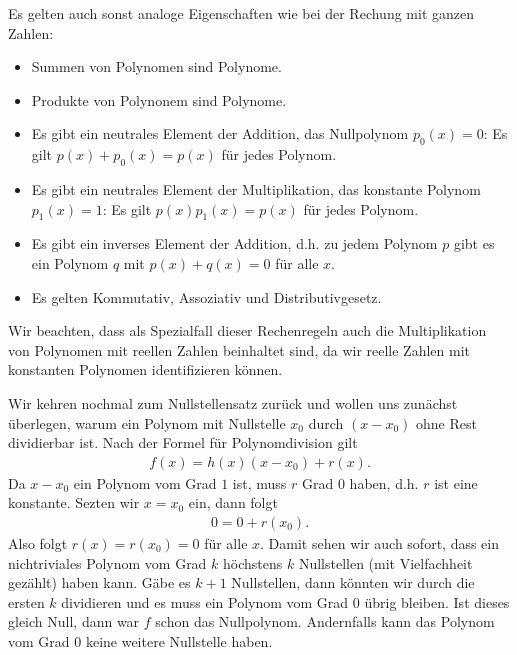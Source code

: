 \documentclass[letterpaper,10pt,english]{jupyterBook}
\begin{document}
Es gelten auch sonst analoge Eigenschaften wie bei der Rechung mit ganzen Zahlen:
\begin{itemize}
\item {} 
Summen von Polynomen sind Polynome.

\item {} 
Produkte von Polynonem sind Polynome.

\item {} 
Es gibt ein neutrales Element der Addition, das Nullpolynom \(p_0(x)=0\): Es gilt \(p(x) + p_0(x) = p(x)\) für jedes Polynom.

\item {} 
Es gibt ein neutrales Element der Multiplikation, das konstante Polynom \(p_1(x)=1\): Es gilt \(p(x) p_1(x) = p(x)\) für jedes Polynom.

\item {} 
Es gibt ein inverses Element der Addition, d.h. zu jedem Polynom \(p\) gibt es ein Polynom \(q\) mit \(p(x) + q(x) =0\) für alle \(x\).

\item {} 
Es gelten Kommutativ\sphinxhyphen{}, Assoziativ\sphinxhyphen{} und Distributivgesetz.

\end{itemize}

Wir beachten, dass als Spezialfall dieser Rechenregeln auch die Multiplikation von Polynomen mit reellen Zahlen beinhaltet sind, da wir reelle Zahlen mit konstanten Polynomen identifizieren können.

Wir kehren nochmal zum Nullstellensatz zurück und wollen uns zunächst überlegen, warum ein Polynom mit Nullstelle \(x_0\) durch \((x-x_0)\) ohne Rest dividierbar ist. Nach der Formel für Polynomdivision gilt
\begin{equation*}
\begin{split} f(x) = h(x) (x-x_0) + r(x).\end{split}
\end{equation*}
Da \(x-x_0\) ein Polynom vom Grad \(1\) ist, muss \(r\) Grad \(0\) haben, d.h. \(r\) ist eine konstante. Sezten wir \(x=x_0\) ein, dann folgt
\begin{equation*}
\begin{split} 0 = 0 + r(x_0) . \end{split}
\end{equation*}
Also folgt \(r(x) =r(x_0) = 0\) für alle \(x\). Damit sehen wir auch sofort, dass ein nichtriviales Polynom vom Grad \(k\) höchstens \(k\) Nullstellen (mit Vielfachheit gezählt) haben kann. Gäbe es \(k+1\) Nullstellen, dann könnten wir durch die ersten \(k\) dividieren und es muss ein Polynom vom Grad \(0\) übrig bleiben. Ist dieses gleich Null, dann war \(f\) schon das Nullpolynom. Andernfalls kann das Polynom vom Grad \(0\) keine weitere Nullstelle haben.
\end{document}
